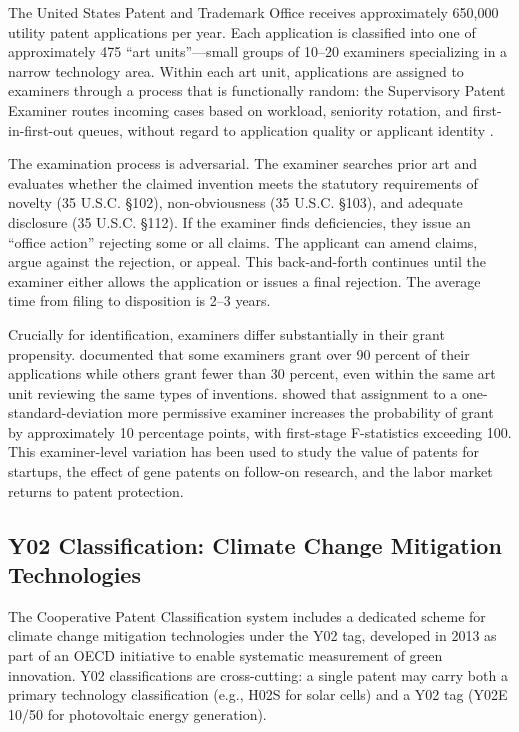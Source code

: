 \documentclass[12pt]{article}
\begin{document}
The United States Patent and Trademark Office receives approximately 650,000 utility patent applications per year. Each application is classified into one of approximately 475 ``art units''---small groups of 10--20 examiners specializing in a narrow technology area. Within each art unit, applications are assigned to examiners through a process that is functionally random: the Supervisory Patent Examiner routes incoming cases based on workload, seniority rotation, and first-in-first-out queues, without regard to application quality or applicant identity \citep{lemley2012, cockburn2003}.

The examination process is adversarial. The examiner searches prior art and evaluates whether the claimed invention meets the statutory requirements of novelty (35 U.S.C. \S102), non-obviousness (35 U.S.C. \S103), and adequate disclosure (35 U.S.C. \S112). If the examiner finds deficiencies, they issue an ``office action'' rejecting some or all claims. The applicant can amend claims, argue against the rejection, or appeal. This back-and-forth continues until the examiner either allows the application or issues a final rejection. The average time from filing to disposition is 2--3 years.

Crucially for identification, examiners differ substantially in their grant propensity. \citet{lemley2012} documented that some examiners grant over 90 percent of their applications while others grant fewer than 30 percent, even within the same art unit reviewing the same types of inventions. \citet{farremensa2020} showed that assignment to a one-standard-deviation more permissive examiner increases the probability of grant by approximately 10 percentage points, with first-stage F-statistics exceeding 100. This examiner-level variation has been used to study the value of patents for startups, the effect of gene patents on follow-on research, and the labor market returns to patent protection.

\subsection{Y02 Classification: Climate Change Mitigation Technologies}

The Cooperative Patent Classification system includes a dedicated scheme for climate change mitigation technologies under the Y02 tag, developed in 2013 as part of an OECD initiative to enable systematic measurement of green innovation. Y02 classifications are cross-cutting: a single patent may carry both a primary technology classification (e.g., H02S for solar cells) and a Y02 tag (Y02E 10/50 for photovoltaic energy generation).
\end{document}
